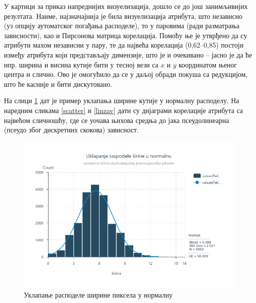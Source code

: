\documentclass[a4paper]{article}
\begin{document}
У картици за приказ напреднијих визуелизација, дошло се до још занимљивијих резултата. Наиме, најзначајнија је била визуелизација атрибута, што независно (уз опцију аутоматског погађања расподеле), то у паровима (ради разматрања зависности), као и Пирсонова матрица корелација. Помоћу ње је утврђено да су атрибути махом независни у пару, те да највећа корелација (0,62--0,85) постоји између атрибута који представљају димензије, што је и очекивано -- јасно је да ће нпр. ширина и висина кутије бити у тесној вези са $x$ и $y$ координатом њеног центра и слично. Ово је омогућило да се у даљој обради покуша са редукцијом, што ће касније и бити дискутовано.

На слици \ref{raspodela} дат је пример уклапања ширине кутије у нормалну расподелу. На наредним сликама \ref{scatter} и \ref{linzav} дати су дијаграми корелације атрибута са највећом сличношћу, где се уочава њихова средња до јака псеудолинеарна (псеудо због дискретних скокова) зависност.

\begin{figure}[h!]
\begin{center}
\includegraphics[scale=0.65]{../Slike za rad/Raspodela sirine.png}
\end{center}
\caption{Уклапање расподеле ширине пиксела у нормалну}
\label{raspodela}
\end{figure}
\end{document}

